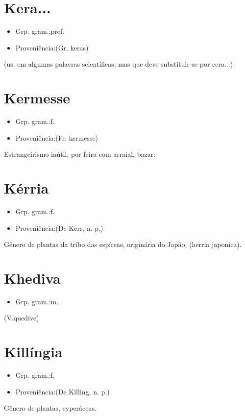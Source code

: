 \documentclass{article}
\begin{document}
\section{Kera...}
\begin{itemize}
\item {Grp. gram.:pref.}
\end{itemize}
\begin{itemize}
\item {Proveniência:(Gr. \textunderscore keras\textunderscore )}
\end{itemize}
(us. em algumas palavras scientíficas, mas que deve substituir-se por \textunderscore cera...\textunderscore )
\section{Kermesse}
\begin{itemize}
\item {Grp. gram.:f.}
\end{itemize}
\begin{itemize}
\item {Proveniência:(Fr. \textunderscore kermesse\textunderscore )}
\end{itemize}
Estrangeirismo inútil, por \textunderscore feira com arraial\textunderscore , \textunderscore bazar\textunderscore .
\section{Kérria}
\begin{itemize}
\item {Grp. gram.:f.}
\end{itemize}
\begin{itemize}
\item {Proveniência:(De \textunderscore Kerr\textunderscore , n. p.)}
\end{itemize}
Gênero de plantas da tríbo das espíreas, originária do Japão, (\textunderscore herria japonica\textunderscore ).
\section{Khediva}
\begin{itemize}
\item {Grp. gram.:m.}
\end{itemize}
(V.quedive)
\section{Killíngia}
\begin{itemize}
\item {Grp. gram.:f.}
\end{itemize}
\begin{itemize}
\item {Proveniência:(De \textunderscore Killing\textunderscore , n. p.)}
\end{itemize}
Gênero de plantas, cyperáceas.
\end{document}
